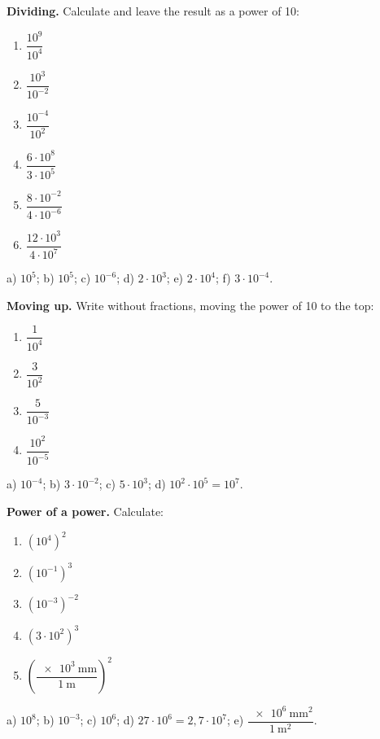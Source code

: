\begin{exercise}
    \textbf{Dividing.} Calculate and leave the result as a power of 10:
    \begin{enumerate}[label=\letraminuscula]
        \item \(\dfrac{10^{9}}{10^{4}}\)
        \item \(\dfrac{10^{3}}{10^{-2}}\)
        \item \(\dfrac{10^{-4}}{10^{2}}\)
        \item \(\dfrac{6 \cdot 10^{8}}{3 \cdot 10^{5}}\)
        \item \(\dfrac{8 \cdot 10^{-2}}{4 \cdot 10^{-6}}\)
        \item \(\dfrac{12 \cdot 10^{3}}{4 \cdot 10^{7}}\)
    \end{enumerate}
    \begin{solu}
        a) \(10^{5}\); b) \(10^{5}\); c) \(10^{-6}\); d) \(2 \cdot 10^{3}\); e) \(2 \cdot 10^{4}\); f) \(3 \cdot 10^{-4}\).
    \end{solu}
\end{exercise}

\begin{exercise}
    \textbf{Moving up.} Write without fractions, moving the power of 10 to the top:
    \begin{enumerate}[label=\letraminuscula]
        \item \(\dfrac{1}{10^{4}}\)
        \item \(\dfrac{3}{10^{2}}\)
        \item \(\dfrac{5}{10^{-3}}\)
        \item \(\dfrac{10^{2}}{10^{-5}}\)
    \end{enumerate}
    \begin{solu}
        a) \(10^{-4}\); b) \(3 \cdot 10^{-2}\); c) \(5 \cdot 10^{3}\); d) \(10^{2} \cdot 10^{5} = 10^{7}\).
    \end{solu}
\end{exercise}

\begin{exercise}
    \textbf{Power of a power.} Calculate:
    \begin{enumerate}[label=\letraminuscula]
        \item \(\left(10^{4}\right)^{2}\)
        \item \(\left(10^{-1}\right)^{3}\)
        \item \(\left(10^{-3}\right)^{-2}\)
        \item \(\left(3 \cdot 10^{2}\right)^{3}\)
        \item \(\left(\dfrac{\qty{e3}{\mm}}{\qty{1}{\m}}\right)^{2}\)
    \end{enumerate}
    \begin{solu}
        a) \(10^{8}\); b) \(10^{-3}\); c) \(10^{6}\); d) \(27 \cdot 10^{6} = 2{,}7 \cdot 10^{7}\); e) \(\dfrac{\qty{e6}{\square\mm}}{\qty{1}{\square\m}}\).
    \end{solu}
\end{exercise}

